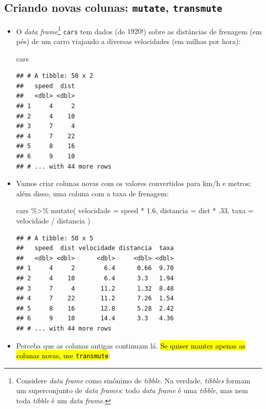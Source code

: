 \documentclass[
  11pt]{report}
\newenvironment{Shaded}{\begin{snugshade}}{\end{snugshade}}
\newcommand{\AttributeTok}[1]{\textcolor[rgb]{0.77,0.63,0.00}{#1}}
\newcommand{\DecValTok}[1]{\textcolor[rgb]{0.00,0.00,0.81}{#1}}
\newcommand{\FloatTok}[1]{\textcolor[rgb]{0.00,0.00,0.81}{#1}}
\newcommand{\FunctionTok}[1]{\textcolor[rgb]{0.00,0.00,0.00}{#1}}
\newcommand{\NormalTok}[1]{#1}
\newcommand{\SpecialCharTok}[1]{\textcolor[rgb]{0.00,0.00,0.00}{#1}}
\renewenvironment{Shaded}{
    \begin{mdframed}[%
      roundcorner=2pt,%
      innerleftmargin=5pt,%
      innerrightmargin=5pt,%
      topline=true,%
      leftline=true,%
      rightline=true,%
      bottomline=true,%
      linewidth=0.5pt,%
      linecolor=black!20,%
      backgroundcolor=black!2,%
      skipabove=2ex,%
      skipbelow=2.5ex%
    ]%
  }
  {
    \end{mdframed}
  }
\begin{document}
\hypertarget{criando-novas-colunas-mutate-transmute}{%
\subsection{\texorpdfstring{Criando novas colunas: \texttt{mutate}, \texttt{transmute}}{Criando novas colunas: mutate, transmute}}\label{criando-novas-colunas-mutate-transmute}}

\begin{itemize}
\item
  O \emph{data frame}\footnote{Considere \emph{data frame} como sinônimo de \emph{tibble}. Na verdade, \emph{tibbles} formam um superconjunto de \emph{data frames}: todo \emph{data frame} é uma \emph{tibble}, mas nem toda \emph{tibble} é um \emph{data frame}.} \texttt{cars} tem dados (de $1920$!) sobre as distâncias de frenagem (em pés) de um carro viajando a diversas velocidades (em milhas por hora):

\begin{Shaded}
\begin{Highlighting}[]
\NormalTok{cars}
\end{Highlighting}
\end{Shaded}

\begin{verbatim}
## # A tibble: 50 x 2
##   speed  dist
##   <dbl> <dbl>
## 1     4     2
## 2     4    10
## 3     7     4
## 4     7    22
## 5     8    16
## 6     9    10
## # ... with 44 more rows
\end{verbatim}
\item
  Vamos criar colunas novas com os valores convertidos para km/h e metros; além disso, uma coluna com a taxa de frenagem:

\begin{Shaded}
\begin{Highlighting}[]
\NormalTok{cars }\SpecialCharTok{\%\textgreater{}\%} 
  \FunctionTok{mutate}\NormalTok{(}
    \AttributeTok{velocidade =}\NormalTok{ speed }\SpecialCharTok{*} \FloatTok{1.6}\NormalTok{,}
    \AttributeTok{distancia =}\NormalTok{ dist }\SpecialCharTok{*}\NormalTok{ .}\DecValTok{33}\NormalTok{,}
    \AttributeTok{taxa =}\NormalTok{ velocidade }\SpecialCharTok{/}\NormalTok{ distancia}
\NormalTok{  )}
\end{Highlighting}
\end{Shaded}

\begin{verbatim}
## # A tibble: 50 x 5
##   speed  dist velocidade distancia  taxa
##   <dbl> <dbl>      <dbl>     <dbl> <dbl>
## 1     4     2        6.4      0.66  9.70
## 2     4    10        6.4      3.3   1.94
## 3     7     4       11.2      1.32  8.48
## 4     7    22       11.2      7.26  1.54
## 5     8    16       12.8      5.28  2.42
## 6     9    10       14.4      3.3   4.36
## # ... with 44 more rows
\end{verbatim}
\item
  Perceba que as colunas antigas continuam lá. {\hl{Se quiser manter apenas as colunas novas, use {\mbox{\texttt{transmute}}}}}:


\end{itemize}
\end{document}
